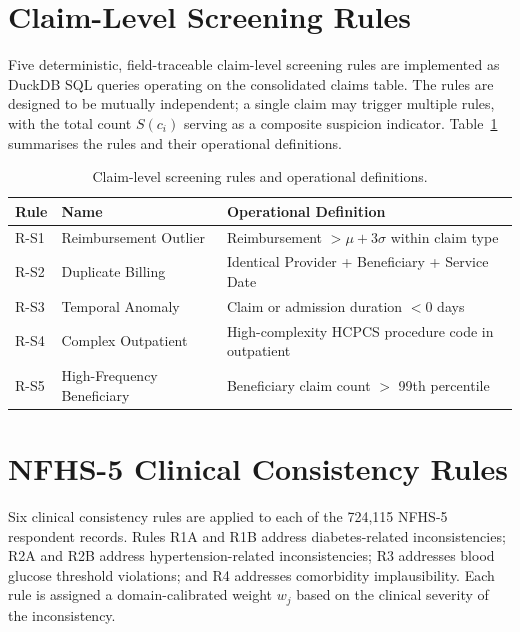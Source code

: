 \section{Claim-Level Screening Rules}
\label{sec:claim-screening}

Five deterministic, field-traceable claim-level screening rules are implemented as DuckDB SQL queries operating on the consolidated claims table. The rules are designed to be mutually independent; a single claim may trigger multiple rules, with the total count $S(c_i)$ serving as a composite suspicion indicator. Table~\ref{tab:screening-rules} summarises the rules and their operational definitions.

\begin{table}[htbp]
\centering
\caption{Claim-level screening rules and operational definitions.}
\label{tab:screening-rules}
\begin{tabular}{@{}llp{6cm}@{}}
\toprule
\textbf{Rule} & \textbf{Name} & \textbf{Operational Definition} \\
\midrule
R-S1 & Reimbursement Outlier      & Reimbursement $> \mu + 3\sigma$ within claim type \\
R-S2 & Duplicate Billing          & Identical Provider + Beneficiary + Service Date \\
R-S3 & Temporal Anomaly           & Claim or admission duration $< 0$ days \\
R-S4 & Complex Outpatient         & High-complexity HCPCS procedure code in outpatient \\
R-S5 & High-Frequency Beneficiary & Beneficiary claim count $>$ 99th percentile \\
\bottomrule
\end{tabular}
\end{table}

\section{NFHS-5 Clinical Consistency Rules}
\label{sec:nfhs-rules}

Six clinical consistency rules are applied to each of the 724,115 NFHS-5 respondent records. Rules R1A and R1B address diabetes-related inconsistencies; R2A and R2B address hypertension-related inconsistencies; R3 addresses blood glucose threshold violations; and R4 addresses comorbidity implausibility. Each rule is assigned a domain-calibrated weight $w_j$ based on the clinical severity of the inconsistency.

